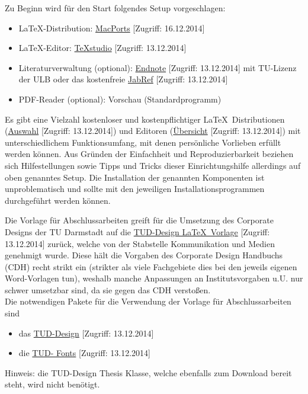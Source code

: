 Zu Beginn wird für den Start folgendes Setup vorgeschlagen:
\begin{itemize}
\item \LaTeX-Distribution: \href{http://www.macports.org/install.php}{MacPorts} [Zugriff: 16.12.2014]
\item \LaTeX-Editor: \href{http://texstudio.sourceforge.net/}{TeXstudio} [Zugriff: 13.12.2014]
\item Literaturverwaltung (optional):
\href{http://www.ulb.tu-darmstadt.de/service/literaturverwaltung_start/endnote_ulb/endnote.de.jsp}{Endnote} [Zugriff: 13.12.2014] mit TU-Lizenz der ULB oder das kostenfreie \href{http://jabref.sourceforge.net/download.php}{JabRef} [Zugriff: 13.12.2014]
\item PDF-Reader (optional): Vorschau (Standardprogramm)
\end{itemize}
Es gibt eine Vielzahl kostenloser und kostenpflichtiger \LaTeX\ Distributionen (\href{http://www.tug.org/interest.html#free}{Auswahl} [Zugriff: 13.12.2014]) und Editoren (\href{http://en.wikipedia.org/wiki/Comparison_of_TeX_editors}{Übersicht} [Zugriff: 13.12.2014]) mit unterschiedlichem Funktionsumfang, mit denen persönliche Vorlieben erfüllt werden können.
Aus Gründen der Einfachheit und Reproduzierbarkeit beziehen sich Hilfestellungen sowie Tipps und Tricks dieser Einrichtungshilfe allerdings auf oben genanntes Setup. Die Installation der genannten Komponenten ist unproblematisch und sollte mit den jeweiligen Installationsprogrammen durchgeführt werden können.

Die Vorlage für Abschlussarbeiten greift für die Umsetzung des Corporate Designs der TU Darmstadt auf die \href{http://exp1.fkp.physik.tu-darmstadt.de/tuddesign/}{TUD-Design \LaTeX\ Vorlage} [Zugriff: 13.12.2014] zurück, welche von der Stabstelle Kommunikation und Medien genehmigt wurde. Diese hält die Vorgaben des Corporate Design Handbuchs (CDH) recht strikt ein (strikter als viele Fachgebiete dies bei den jeweils eigenen Word-Vorlagen tun), weshalb manche Anpassungen an Institutsvorgaben u.U. nur schwer umsetzbar sind, da sie gegen das CDH verstoßen.\\
Die notwendigen Pakete für die Verwendung der Vorlage für Abschlussarbeiten sind
\begin{itemize}
	\item das \href{http://exp1.fkp.physik.tu-darmstadt.de/tuddesign/latex/latex-tuddesign/latex-tuddesign_0.0.20100410.zip}{TUD-Design} [Zugriff: 13.12.2014]
	\item die \href{http://exp1.fkp.physik.tu-darmstadt.de/tuddesign/latex/tudfonts-tex/tudfonts-tex_0.0.20090806.zip}{TUD- Fonts} [Zugriff: 13.12.2014]
\end{itemize}
Hinweis: die TUD-Design Thesis Klasse, welche ebenfalls zum Download bereit steht, wird nicht benötigt.

